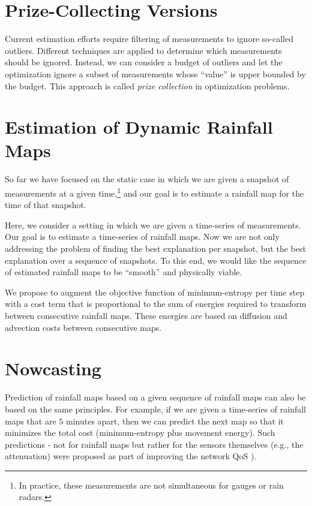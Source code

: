 \documentclass{article}
\begin{document}
\section{Prize-Collecting Versions}

Current estimation efforts require filtering of measurements to ignore so-called outliers. Different techniques are applied to determine which measurements should be ignored. Instead, we can consider a budget of outliers and let the optimization ignore a subset of measurements whose ``value'' is upper bounded by the budget. This approach is called \emph{prize collection} in optimization problems.

\section{Estimation of Dynamic Rainfall Maps}

So far we have focused on the static case in which we are given a snapshot of measurements at a given time,\footnote{In practice, these measurements are not simultaneous for gauges or rain radars.} and our goal is to estimate a rainfall map for the time of that snapshot.

Here, we consider a setting in which we are given a time-series of measurements. Our goal is to estimate a time-series of rainfall maps. Now we are not only addressing the problem of finding the best explanation per snapshot, but the best explanation over a sequence of snapshots. To this end, we would like the sequence of estimated rainfall maps to be ``smooth'' and physically viable.

We propose to augment the objective function of minimum-entropy per time step with a cost term that is proportional to the sum of energies required to transform between consecutive rainfall maps. These energies are based on diffusion and advection costs between consecutive maps.


\section{Nowcasting}
Prediction of rainfall maps based on a given sequence of rainfall maps can also be based on the same principles. For example, if we are given a time-series of rainfall maps that are $5$ minutes apart, then we can predict the next map so that it minimizes the total cost (minimum-entropy plus movement energy). Such predictions - not for rainfall maps but rather for the sensors themselves (e.g., the attenuation) were proposed as part of improving the network QoS \cite{jacoby2021short,kadota2022switching,jacoby2025spatio}).




\end{document}
